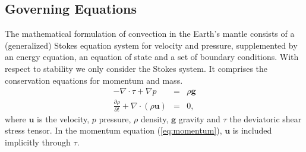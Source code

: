 \documentclass[times]{fldauth}
\newcommand{\mb}{\mathbf}
\newcommand{\pdiff}[2]{\frac{\partial#1}{\partial #2}}
\begin{document}
\subsection{Governing Equations}
The mathematical formulation of convection in the Earth's mantle consists of a
(generalized) Stokes equation system for velocity and pressure, supplemented by an
energy equation, an equation of state and a set of boundary conditions. 
With respect to stability we only consider the Stokes system. 
It comprises the conservation equations for momentum and mass.
\begin{eqnarray}
   - \nabla \cdot \tau + \nabla p &=& \rho \mb g \label{eq:momentum} \\ 
   \pdiff{\rho}{t} + \nabla \cdot(\rho \mb u) &=& 0, \label{eq:mass} 
\end{eqnarray}
where $\mb u$ is the velocity, $p$ pressure, $\rho$ density, 
$\mb g$ gravity and $\tau$ the deviatoric shear stress tensor. 
In the momentum equation (\ref{eq:momentum}), $\mb u$ is included implicitly
through $\tau$. 
\end{document}
